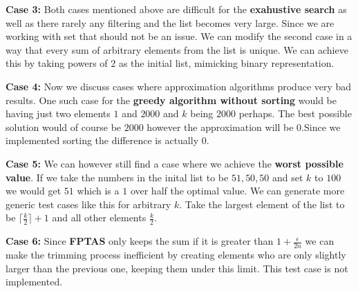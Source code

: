 \documentclass[11pt]{article}
\begin{document}
\textbf{Case 3:} Both cases mentioned above are difficult for the \textbf{exahustive search} as well as there rarely any filtering and the list becomes very large. Since we are working with set that should not be an issue. We can modify the second case in a way that every sum of arbitrary elements from the list is unique. We can achieve this by taking powers of $2$ as the initial list, mimicking binary representation. 

\textbf{Case 4:} Now we discuss cases where approximation algorithms produce very bad results. One such case for the \textbf{greedy algorithm without sorting} would be having just two elements $1$ and $2000$ and $k$ being $2000$ perhaps. The best possible solution would of course be $2000$ however the approximation will be $0$.Since we implemented sorting the difference is actually $0$.

\textbf{Case 5:} We can however still find a case where we achieve the \textbf{worst possible value}. If we take the numbers  in the inital list to be $51, 50, 50$ and set $k$ to $100$ we would get $51$ which is a $1$ over half the optimal value. We can generate more generic test cases like this for arbitrary $k$. Take the largest element of the list to be $\lceil \frac{k}{2} \rceil + 1$ and all other elements $\frac{k}{2}$.

\textbf{Case 6:} Since \textbf{FPTAS} only keeps the sum if it is greater than $1 + \frac{\epsilon}{2n}$ we can make the trimming process inefficient by creating elements who are only slightly larger than the previous one, keeping them under this limit. This test case is not implemented. %
\end{document}
